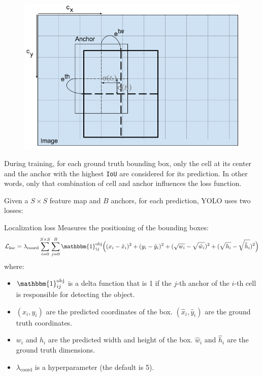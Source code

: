 \begin{description}
        \begin{figure}[H]
            \centering
            \includegraphics[width=0.5\linewidth]{./img/yolo_anchor.png}
        \end{figure}


    \item[Training] 
        During training, for each ground truth bounding box, 
        only the cell at its center and the anchor with the highest \texttt{IoU} are considered for its prediction.
        In other words, only that combination of cell and anchor influences the loss function.

        Given a $S \times S$ feature map and $B$ anchors, for each prediction, YOLO uses two losses:
        \begin{descriptionlist}
            \item[Localization loss] 
                Measures the positioning of the bounding boxes:
                \[ 
                    \mathcal{L}_\text{loc} = \lambda_\text{coord} \sum_{i=0}^{S \times S} \sum_{j=0}^{B} \mathbbm{1}_{ij}^\text{obj} \Big( 
                        (x_i - \hat{x}_i)^2 + (y_i - \hat{y}_i)^2 +
                        (\sqrt{w_i} - \sqrt{\hat{w}_i})^2 + (\sqrt{h_i} - \sqrt{\hat{h}_i})^2
                    \Big) 
                \]
                where:
                \begin{itemize}
                    \item $\mathbbm{1}_{ij}^\text{obj}$ is a delta function that is 1 if the $j$-th anchor of the $i$-th cell is responsible for detecting the object.
                    \item $(x_i, y_i)$ are the predicted coordinates of the box. $(\hat{x}_i, \hat{y}_i)$ are the ground truth coordinates.
                    \item $w_i$ and $h_i$ are the predicted width and height of the box. $\hat{w}_i$ and $\hat{h}_i$ are the ground truth dimensions.
                    \item $\lambda_\text{coord}$ is a hyperparameter (the default is 5).
                \end{itemize}


\end{descriptionlist}
\end{description}
